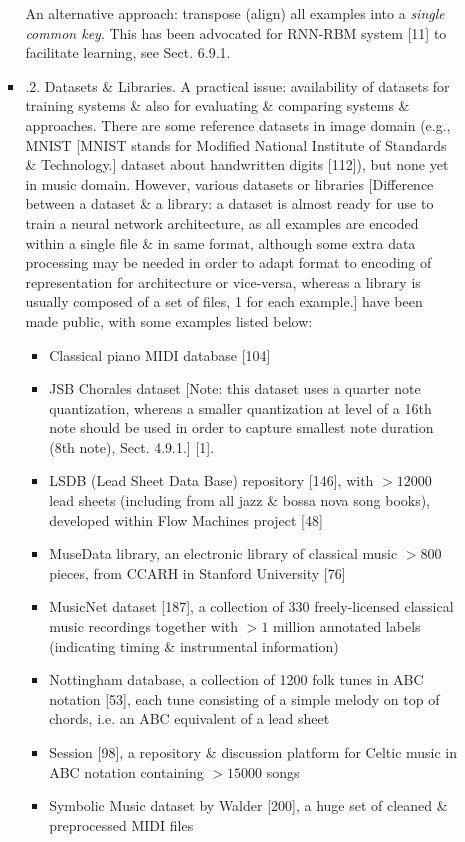 \documentclass{article}
\begin{document}
\begin{itemize}
\begin{itemize}
\begin{itemize}
			An alternative approach: transpose (align) all examples into a {\it single common key}. This has been advocated for RNN-RBM system [11] to facilitate learning, see Sect. 6.9.1.
			\item {.2. Datasets \& Libraries.} A practical issue: availability of datasets for training systems \& also for evaluating \& comparing systems \& approaches. There are some reference datasets in image domain (e.g., MNIST [MNIST stands for Modiﬁed National Institute of Standards \& Technology.] dataset about handwritten digits [112]), but none yet in music domain. However, various datasets or libraries [Difference between a dataset \& a library: a dataset is almost ready for use to train a neural network architecture, as all examples are encoded within a single file \& in same format, although some extra data processing may be needed in order to adapt format to encoding of representation for architecture or vice-versa, whereas a library is usually composed of a set of files, 1 for each example.] have been made public, with some examples listed below:
			\begin{itemize}
				\item Classical piano MIDI database [104]
				\item JSB Chorales dataset [Note: this dataset uses a quarter note quantization, whereas a smaller quantization at level of a 16th note should be used in order to capture smallest note duration (8th note), Sect. 4.9.1.] [1].
				\item LSDB (Lead Sheet Data Base) repository [146], with $> 12000$ lead sheets (including from all jazz \& bossa nova song books), developed within Flow Machines project [48]
				\item MuseData library, an electronic library of classical music $> 800$ pieces, from CCARH in Stanford University [76]
				\item MusicNet dataset [187], a collection of 330 freely-licensed classical music recordings together with $> 1$ million annotated labels (indicating timing \& instrumental information)
				\item Nottingham database, a collection of 1200 folk tunes in ABC notation [53], each tune consisting of a simple melody on top of chords, i.e. an ABC equivalent of a lead sheet
				\item Session [98], a repository \& discussion platform for Celtic music in ABC notation containing $> 15000$ songs
				\item Symbolic Music dataset by Walder [200], a huge set of cleaned \& preprocessed MIDI files

\end{itemize}
\end{itemize}
\end{itemize}
\end{itemize}
\end{document}
